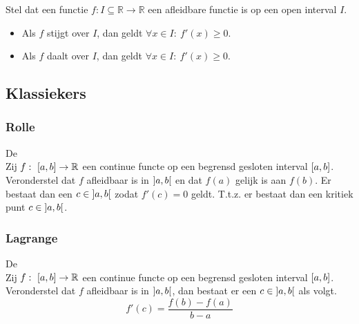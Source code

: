 \documentclass[main.tex]{subfiles}
\begin{document}
\begin{pr}
  Stel dat een functie $f: I \subseteq \mathbb{R} \rightarrow \mathbb{R}$ een afleidbare functie is op een open interval $I$.
  \begin{itemize}
  \item Als $f$ stijgt over $I$, dan geldt $\forall x\in I:\ f'(x) \ge 0$.
  \item Als $f$ daalt over $I$, dan geldt $\forall x\in I:\ f'(x) \ge 0$.
  \end{itemize}
\end{pr}


\subsection{Klassiekers}
\label{sec:twee-klassiekers}

\subsubsection{Rolle}
\label{sec:rolle}

\begin{st}
  De \\
  Zij $f:\ \interval{a}{b} \rightarrow \mathbb{R}$ een continue functe op een begrensd gesloten interval $\interval{a}{b}$.
  Veronderstel dat $f$ afleidbaar is in $\interval[open]{a}{b}$ en dat $f(a)$ gelijk is aan $f(b)$.
  Er bestaat dan een $c\in \interval[open]{a}{b}$ zodat $f'(c)=0$ geldt.
  T.t.z. er bestaat dan een kritiek punt $c\in \interval[open]{a}{b}$.
\end{st}

\subsubsection{Lagrange}
\label{sec:lagrange}

\begin{st}
  De \\
  Zij $f:\ \interval{a}{b} \rightarrow \mathbb{R}$ een continue functe op een begrensd gesloten interval $\interval{a}{b}$.
  Veronderstel dat $f$ afleidbaar is in $\interval[open]{a}{b}$, dan bestaat er een $c\in \interval[open]{a}{b}$ als volgt.
  \[ f'(c) = \frac{f(b)-f(a)}{b-a} \]
\end{st}

\end{document}
